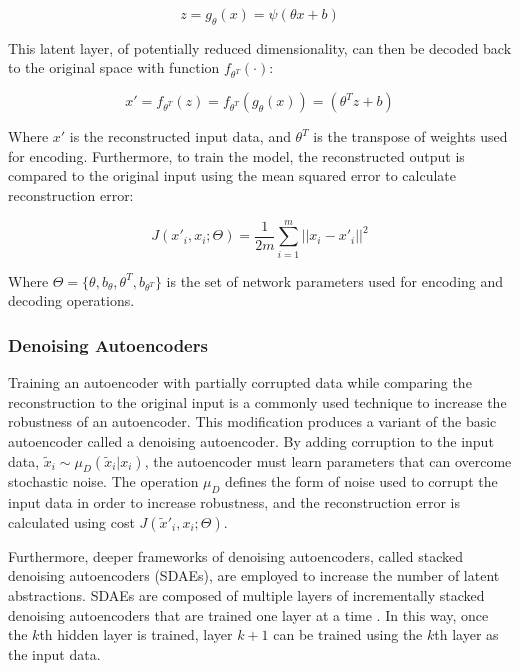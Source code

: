 \begin{equation}
z = g_{\theta}(x) = \psi(\theta x + b)
\end{equation}

This latent layer, of potentially reduced dimensionality, can then be decoded back to the original space with function $f_{\theta^{T}}(\cdot)$:

\begin{equation}
x' = f_{\theta^{T}}(z) =  f_{\theta^{T}}(g_{\theta}(x)) = (\theta^{T}z + b)
\end{equation}

Where $x'$ is the reconstructed input data, and $\theta^{T}$ is the transpose of weights used for encoding. Furthermore, to train the model, the reconstructed output is compared to the original input using the mean squared error to calculate reconstruction error:

\begin{equation}
J(x'_{i},x_{i};\Theta) = \frac{1}{2m}{\sum^{m}_{i=1}} ||x_i - x'_i||^2
\end{equation}

Where $\Theta = \{\theta, b_\theta,\theta^{T}, b_{\theta^{T}}\}$ is the set of network parameters used for encoding and decoding operations. 

\subsubsection{Denoising Autoencoders}
Training an autoencoder with partially corrupted data while comparing the reconstruction to the original input is a commonly used technique to increase the robustness of an autoencoder. This modification produces a variant of the basic autoencoder called a denoising autoencoder. By adding corruption to the input data, $\tilde{x}_{i} \sim \mu_{D}(\tilde{x}_{i}|x_{i})$, the autoencoder must learn parameters that can overcome stochastic noise. The operation $\mu_{D}$ defines the form of noise used to corrupt the input data in order to increase robustness, and the reconstruction error is calculated using cost $J(\tilde{x}'_{i},x_{i};\Theta)$. 

Furthermore, deeper frameworks of denoising autoencoders, called stacked denoising autoencoders (SDAEs), are employed to increase the number of latent abstractions. SDAEs are composed of multiple layers of incrementally stacked denoising autoencoders that are trained one layer at a time \cite{vincent2010stacked}. In this way, once the $k$th hidden layer is trained, layer $k+1$ can be trained using the $k$th layer as the input data.

